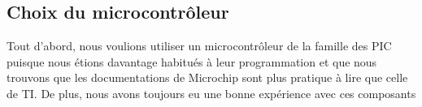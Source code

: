 \documentclass[11pt, french]{article} %
\begin{document}
\subsection{Choix du microcontrôleur}

Tout d'abord, nous voulions utiliser un microcontrôleur de la famille des PIC puisque nous étions davantage habitués à leur programmation et que nous trouvons que les documentations de Microchip sont plus pratique à lire que celle de TI. De plus, nous avons toujours eu une bonne expérience avec ces composants  %
%
%
%
%
%
%


\end{document}
